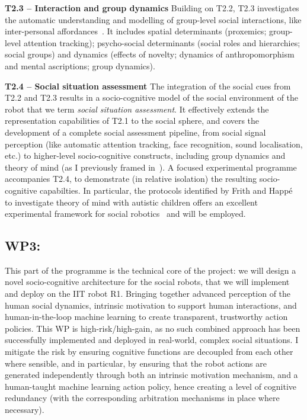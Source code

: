 \textbf{T2.3 -- Interaction and group dynamics} Building on T2.2, T2.3
investigates the automatic understanding and modelling of group-level social
interactions, like inter-personal affordances~\cite{pandey2013affordance}. It
includes spatial determinants (proxemics; group-level attention tracking);
psycho-social determinants (social roles and hierarchies; social groups) and
dynamics (effects of novelty; dynamics of anthropomorphism and mental
ascriptions; group dynamics). 


\textbf{T2.4 -- Social situation assessment} The integration of the social cues
from T2.2 and T2.3 results in a socio-cognitive model of the social environment
of the robot that we term \emph{social situation assessment}.  It effectively
extends the representation capabilities of T2.1 to the social sphere, and covers
the development of a complete social assessment pipeline, from social signal
perception (like automatic attention tracking, face recognition, sound
localisation, etc.) to higher-level socio-cognitive constructs, including group
dynamics and theory of mind (as I previously framed
in~\cite{lemaignan2015mutual, dillenbourg2016symmetry}). A focused experimental
programme accompanies T2.4, to demonstrate (in relative isolation) the resulting
socio-cognitive capabilties. In particular, the protocols identified by Frith
and Happé~\cite{frith1994autism} to investigate theory of mind with autistic
children offers an excellent experimental framework for social
robotics~\cite{lemaignan2015mutual} and will be employed.

\subsection{WP3: \textbf{\wpThree}}

This part of the programme is the technical core of the project: we will design
a novel socio-cognitive architecture for the
social robots, that we will implement and deploy on the IIT robot R1.
Bringing together advanced perception of the human social dynamics,
intrinsic motivation to support human interactions, and human-in-the-loop
machine learning to create transparent, trustworthy action policies. This WP is
high-risk/high-gain, as no such combined approach has been successfully
implemented and deployed in real-world, complex social situations. I mitigate
the risk by ensuring cognitive functions are decoupled from each other where
sensible, and in particular, by ensuring that the robot actions are generated
independently through both an intrinsic motivation mechanism, and a human-taught
machine learning action policy, hence creating a level of cognitive redundancy
(with the corresponding arbitration mechanisms in place where necessary).

